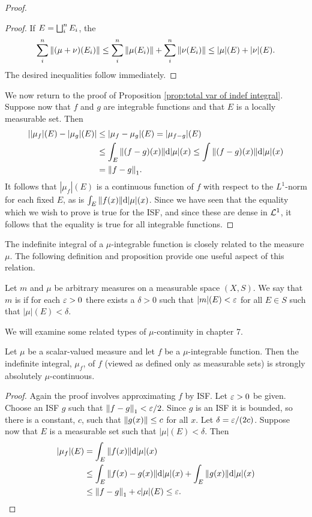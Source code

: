 \begin{proof}
\begin{proof}
If $E=\bigsqcup_i^nE_i$, the $$\sum_i^n\norm{(\mu+\nu)(E_i)}\leq\sum_i^n\norm{\mu(E_i)}+\sum_i^n\norm{\nu(E_i)}\leq|\mu|(E)+|\nu|(E).$$ The desired inequalities follow immediately.
\end{proof}

We now return to the proof of Proposition \ref{prop:total var of indef integral}. Suppose now that $f$ and $g$ are integrable functions and that $E$ is a locally measurable set. Then
\begin{align*}
    ||\mu_f|(E)-|\mu_g|(E)|&\leq|\mu_f-\mu_g|(E)=|\mu_{f-g}|(E)\\
    &\leq\int_E\norm{(f-g)(x)}\dd|\mu|(x)\leq\int\norm{(f-g)(x)}\dd|\mu|(x)\\
    &=\norm{f-g}_1.
\end{align*}
It follows that $|\mu_f|(E)$ is a continuous function of $f$ with respect to the $L^1$-norm for each fixed $E$, as is $\int_E\norm{f(x)}\dd|\mu|(x)$. Since we have seen that the equality which we wish to prove is true for the ISF, and since these are dense in ${\cal L}^1$, it follows that the equality is true for all integrable functions.

\end{proof}

The indefinite integral of a $\mu$-integrable function is closely related to the measure $\mu$. The following definition and proposition provide one useful aspect of this relation.

\begin{definition}
Let $m$ and $\mu$ be arbitrary measures on a measurable space $(X,S)$. We say that $m$ is  if for each $\varepsilon>0$ there exists a $\delta>0$ such that $|m|(E)<\varepsilon$ for all $E\in S$ such that $|\mu|(E)<\delta$.
\end{definition}

We will examine some related types of $\mu$-continuity in chapter 7. %

\begin{proposition}
\label{prop:indef int mu strong abs cts}
Let $\mu$ be a scalar-valued measure and let $f$ be a $\mu$-integrable function. Then the indefinite integral, $\mu_f$, of $f$ (viewed as defined only as measurable sets) is strongly absolutely $\mu$-continuous.
\end{proposition}

\begin{proof}
Again the proof involves approximating $f$ by ISF. Let $\varepsilon>0$ be given. Choose an ISF $g$ such that $\norm{f-g}_1<\varepsilon/2$. Since $g$ is an ISF it is bounded, so there is a constant, $c$, such that $\norm{g(x)}\leq c$ for all $x$. Let $\delta=\varepsilon/(2c)$. Suppose now that $E$ is a measurable set such that $|\mu|(E)<\delta$. Then
\begin{align*}
    |\mu_f|(E)&=\int_E\norm{f(x)}\dd|\mu|(x)\\
    &\leq\int_E\norm{f(x)-g(x)}\dd|\mu|(x)+\int_E\norm{g(x)}\dd|\mu|(x)\\
    &\leq\norm{f-g}_1+c|\mu|(E)\leq\varepsilon.
\end{align*}
\end{proof}

